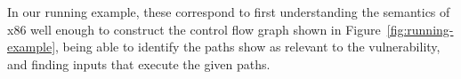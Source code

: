 \begin{enumerate}





\end{enumerate}

In our running example, these correspond to first understanding the
semantics of x86 well enough to construct the control flow graph shown
in Figure~\ref{fig:running-example}, being able to identify the paths
show as relevant to the vulnerability, and finding inputs that execute
the given paths.








